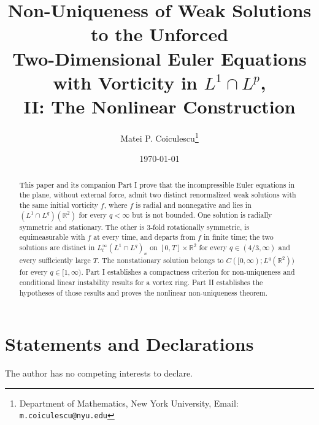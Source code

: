 \documentclass[11pt]{article}
\title{Non-Uniqueness of Weak Solutions to the Unforced\\
Two-Dimensional Euler Equations\\ with Vorticity in $L^1\cap L^p$,\\
II: The Nonlinear Construction}
\author{Matei P. Coiculescu\thanks{
Department of Mathematics, New York University,
Email: \texttt{m.coiculescu@nyu.edu}
}}
\date{\today}
\begin{document}
\maketitle

\begin{abstract}
This paper and its companion Part I prove that the incompressible Euler
equations in the plane, without external force, admit two distinct renormalized
weak solutions with the same initial vorticity $f$, where $f$ is radial and
nonnegative and lies in $(L^1\cap L^q)(\mathbb{R}^2)$ for every $q<\infty$ but is
not bounded. One solution is radially symmetric and stationary. The other is
$3$-fold rotationally symmetric, is equimeasurable with $f$ at every time, and
departs from $f$ in finite time; the two solutions are distinct in
$L^\infty_t(L^1\cap L^q)_x$ on $[0,T]\times\mathbb{R}^2$ for every
$q\in(4/3,\infty)$ and every sufficiently large $T$. The nonstationary solution
belongs to $C([0,\infty);L^q(\mathbb{R}^2))$ for every $q\in[1,\infty)$.
Part I establishes a compactness criterion for non-uniqueness and conditional
linear instability results for a vortex ring. Part II establishes the hypotheses
of those results and proves the nonlinear non-uniqueness theorem.
\end{abstract}










\appendix




\section*{Statements and Declarations}
The author has no competing interests to declare.


\end{document}
